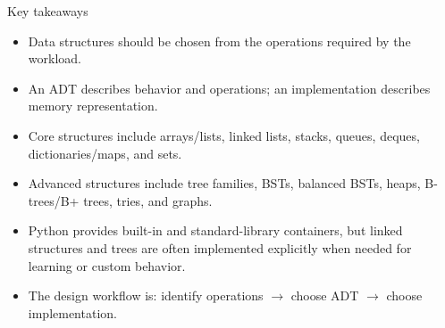 \documentclass[aspectratio=169]{beamer}
\begin{document}
\begin{frame}{Key takeaways}
\small
\begin{itemize}
  \item Data structures should be chosen from the operations required by the workload.
  \item An ADT describes behavior and operations; an implementation describes memory representation.
  \item Core structures include arrays/lists, linked lists, stacks, queues, deques, dictionaries/maps, and sets.
  \item Advanced structures include tree families, BSTs, balanced BSTs, heaps, B-trees/B+ trees, tries, and graphs.
  \item Python provides built-in and standard-library containers, but linked structures and trees are often implemented explicitly when needed for learning or custom behavior.
  \item The design workflow is: identify operations $\rightarrow$ choose ADT $\rightarrow$ choose implementation.
\end{itemize}
\end{frame}
\end{document}
